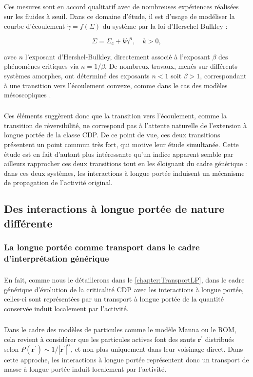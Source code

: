 \subparagraph{}Ces mesures sont en accord qualitatif avec de nombreuses expériences réalisées sur les fluides à seuil. Dans ce domaine d'étude, il est d'usage de modéliser la courbe d'écoulement $\dot{\gamma} = f(\Sigma)$ du système par la loi d'Herschel-Bulkley :

\begin{equation}
	\Sigma = \Sigma_c + k\dot{\gamma}^n, \quad k > 0,
\end{equation}

\noindent avec $n$ l'exposant d'Hershel-Bulkley, directement associé à l'exposant $\beta$ des phénomènes critiques via $n=1/\beta$. De nombreux travaux, menés sur différents systèmes amorphes, ont déterminé des exposants $n<1$ soit $\beta > 1$, correspondant à une transition vers l'écoulement convexe, comme dans le cas des modèles mésoscopiques \cite{nicolas_deformation_2018}.

\subparagraph{}Ces éléments suggèrent donc que la transition vers l'écoulement, comme la transition de réversibilité, ne correspond pas à l'attente naturelle de l'extension à longue portée de la classe CDP. De ce point de vue, ces deux transitions présentent un point commun très fort, qui motive leur étude simultanée. Cette étude est en fait d'autant plus intéressante qu'un indice apparent semble par ailleurs rapprocher ces deux transitions tout en les éloignant du cadre générique : dans ces deux systèmes, les interactions à longue portée induisent un mécanisme de propagation de l'activité original.

\subsection{Des interactions à longue portée de nature différente}

\subsubsection{La longue portée comme transport dans le cadre d'interprétation générique}

\subparagraph{}En fait, comme nous le détaillerons dans le \autoref{chapter:TransportLP}, dans le cadre générique d'évolution de la criticalité CDP avec les interactions à longue portée, celles-ci sont représentées par un transport à longue portée de la quantité conservée induit localement par l'activité.

\subparagraph{}Dans le cadre des modèles de particules comme le modèle Manna ou le ROM, cela revient à considérer que les particules actives font des sauts $\mathbf{r}^\prime$ distribués selon $P(\mathbf{r}^\prime)\sim 1/|\mathbf{r}^{\prime}|^{\alpha}$, et non plus uniquement dans leur voisinage direct. Dans cette approche, les interactions à longue portée représentent donc un transport de masse à longue portée induit localement par l'activité.

